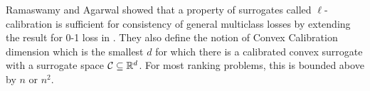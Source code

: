 Ramaswamy and Agarwal \cite{ramaswamy2016convex} showed that a property of surrogates called $\ell$-calibration is sufficient for consistency of general multiclass losses by extending the result for 0-1 loss in \cite{tewari2007consistency}. They also define the notion of Convex Calibration dimension which is the smallest $d$ for which there is a calibrated convex surrogate with a surrogate space ${\mathcal C} \subseteq {\mathbb R}^d$. For most ranking problems, this is bounded above by $n$ or $n^2$. 

% 
